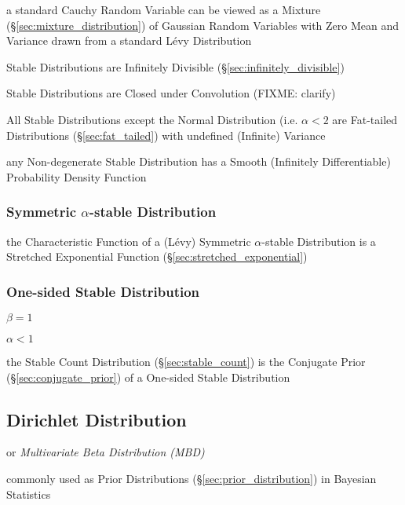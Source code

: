a standard Cauchy Random Variable can be viewed as a Mixture
(\S\ref{sec:mixture_distribution}) of Gaussian Random Variables with Zero Mean
and Variance drawn from a standard L\'evy Distribution

Stable Distributions are Infinitely Divisible (\S\ref{sec:infinitely_divisible})

Stable Distributions are Closed under Convolution (FIXME: clarify)

All Stable Distributions except the Normal Distribution (i.e. $\alpha < 2$ are
Fat-tailed Distributions (\S\ref{sec:fat_tailed}) with undefined (Infinite)
Variance

any Non-degenerate Stable Distribution has a Smooth (Infinitely Differentiable)
Probability Density Function



\subsubsection{Symmetric $\alpha$-stable Distribution}
\label{sec:symmetric_alpha_stable}

the Characteristic Function of a (L\'evy) Symmetric $\alpha$-stable Distribution
is a Stretched Exponential Function (\S\ref{sec:stretched_exponential})



\subsubsection{One-sided Stable Distribution}\label{sec:onesided_stable}

$\beta = 1$

$\alpha < 1$

the Stable Count Distribution (\S\ref{sec:stable_count}) is the Conjugate Prior
(\S\ref{sec:conjugate_prior}) of a One-sided Stable Distribution



\subsection{Dirichlet Distribution}\label{sec:dirichlet_distribution}

or \emph{Multivariate Beta Distribution (MBD)}

commonly used as Prior Distributions (\S\ref{sec:prior_distribution}) in
Bayesian Statistics



